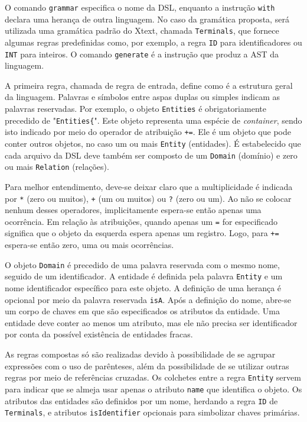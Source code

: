 O comando \texttt{grammar} especifica o nome da \ac{DSL}, enquanto a instrução \texttt{with} declara uma herança de outra linguagem. 
No caso da gramática proposta, será utilizada uma gramática padrão do Xtext, chamada \texttt{Terminals}, que fornece algumas regras predefinidas como, por exemplo, a regra \texttt{ID} para identificadores ou \texttt{INT} para inteiros. 
O comando \texttt{generate} é a instrução que produz a \ac{AST} da linguagem.

A primeira regra, chamada de regra de entrada, define como é a estrutura geral da linguagem. 
Palavras e símbolos entre aspas duplas ou simples indicam as palavras reservadas. 
Por exemplo, o objeto \texttt{Entities} é obrigatoriamente precedido de "\texttt{Entities\{}". 
Este objeto representa uma espécie de \textit{container}, sendo isto indicado por meio do operador de atribuição \texttt{+=}. 
Ele é um objeto que pode conter outros objetos, no caso um ou mais \texttt{Entity} (entidades). 
É estabelecido que cada arquivo da \ac{DSL} deve também ser composto de um \texttt{Domain} (domínio) e zero ou mais \texttt{Relation} (relações). 

Para melhor entendimento, deve-se deixar claro que a multiplicidade é indicada por \texttt{*} (zero ou muitos), \texttt{+} (um ou muitos) ou \texttt{?} (zero ou um). 
Ao não se colocar nenhum desses operadores, implicitamente espera-se então apenas uma ocorrência. 
Em relação às atribuições, quando apenas um \texttt{=} for especificado significa que o objeto da esquerda espera apenas um registro. 
Logo, para \texttt{+=} espera-se então zero, uma ou mais ocorrências. 

O objeto \texttt{Domain} é precedido de uma palavra reservada com o mesmo nome, seguido de um identificador. 
A entidade é definida pela palavra \texttt{Entity} e um nome identificador específico para este objeto. 
A definição de uma herança é opcional por meio da palavra reservada \texttt{isA}. 
Após a definição do nome, abre-se um corpo de chaves em que são especificados os atributos da entidade. 
Uma entidade deve conter ao menos um atributo, mas ele não precisa ser identificador por conta da possível existência de entidades fracas. 

As regras compostas só são realizadas devido à possibilidade de se agrupar expressões com o uso de parênteses, além da possibilidade de se utilizar outras regras por meio de referências cruzadas. 
Os colchetes entre a regra \texttt{Entity} servem para indicar que se almeja usar apenas o atributo \texttt{name} que identifica o objeto. 
Os atributos das entidades são definidos por um nome, herdando a regra \texttt{ID} de \texttt{Terminals}, e atributos \texttt{isIdentifier} opcionais para simbolizar chaves primárias. 

